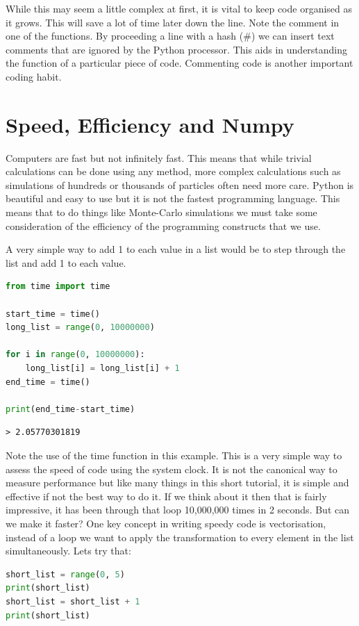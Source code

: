 While this may seem a little complex at first, it is vital to keep code organised as it grows. This will save a lot of time later down the line. Note the comment in one of the functions. By proceeding a line with a hash (\#) we can insert text comments that are ignored by the Python processor. This aids in understanding the function of a particular piece of code. Commenting code is another important coding habit. 

\section{Speed, Efficiency and Numpy}
	Computers are fast but not infinitely fast. This means that while trivial calculations can be done using any method, more complex calculations such as simulations of hundreds or thousands of particles often need more care. Python is beautiful and easy to use but it is not the fastest programming language. This means that to do things like Monte-Carlo simulations we must take some consideration of the efficiency of the programming constructs that we use.

	A very simple way to add 1 to each value in a list would be to step through the list and add 1 to each value.
	\begin{lstlisting}[language=Python]
from time import time

start_time = time()
long_list = range(0, 10000000)

for i in range(0, 10000000):
	long_list[i] = long_list[i] + 1
end_time = time()

print(end_time-start_time)\end{lstlisting}
	\begin{verbatim}> 2.05770301819\end{verbatim}

	Note the use of the time function in this example. This is a very simple way to assess the speed of code using the system clock. It is not the canonical way to measure performance but like many things in this short tutorial, it is simple and effective if not the best way to do it.
	If we think about it then that is fairly impressive, it has been through that loop 10,000,000 times in 2 seconds. But can we make it faster? One key concept in writing speedy code is vectorisation, instead of a loop we want to apply the transformation to every element in the list simultaneously. Lets try that:

	\begin{lstlisting}[language=Python]
short_list = range(0, 5)
print(short_list)
short_list = short_list + 1
print(short_list)\end{lstlisting}

